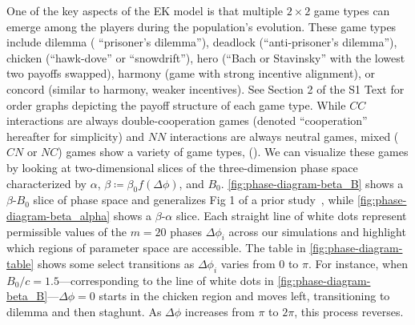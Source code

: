 \documentclass[10pt,letterpaper]{article}
\begin{document}
One of the key aspects of the EK model
is that multiple $2 \times 2$ game types can emerge
among the players during the population's evolution.
These game types~\cite{bruns2015names} include
dilemma (\aka{} ``prisoner's dilemma''),
deadlock (``anti-prisoner's dilemma''),
chicken (``hawk-dove'' or ``snowdrift''),
hero (``Bach or Stavinsky'' with the lowest two payoffs swapped),
harmony (game with strong incentive alignment),
or
concord (similar to harmony, weaker incentives).
See Section 2 of the S1 Text
for order graphs depicting the payoff structure of each game type.
While $CC$ interactions are always double-cooperation games
(denoted ``cooperation'' hereafter for simplicity)
and $NN$ interactions are always neutral games,
mixed ($CN$ or $NC$) games show a variety of game types,
().
We can visualize these games
by looking at two-dimensional slices
of the three-dimension phase space
characterized by $\alpha$, $\beta \coloneqq \beta_0 f(\Delta \phi)$,
and $B_0$.
\cref{fig:phase-diagram-beta_B} shows a $\beta$-$B_0$ slice of phase space
and generalizes Fig 1 of a prior study~\cite{tripp2022evolutionary},
while \cref{fig:phase-diagram-beta_alpha} shows a $\beta$-$\alpha$ slice.
Each straight line of white dots represent permissible values of the $m = 20$ phases
$\Delta \phi_i$ across our simulations
and highlight which regions of parameter space are accessible.
The table in \cref{fig:phase-diagram-table}
shows some select transitions as $\Delta \phi_i$ varies from $0$ to
$\pi$.
For instance, when $B_0/c=1.5$---corresponding to the line of white dots
in \cref{fig:phase-diagram-beta_B}---$\Delta \phi=0$ starts in the
chicken region and moves left, transitioning to dilemma and then
staghunt.
As $\Delta \phi$ increases from $\pi$ to $2\pi$, this process reverses.
\end{document}
